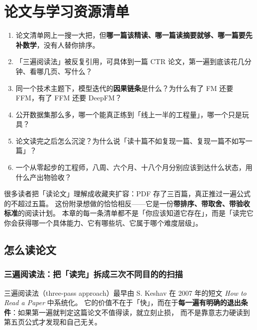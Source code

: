 \chapter{论文与学习资源清单}
\label{app:papers}

\begin{insight}[本附录要解决的问题]
\begin{enumerate}
  \item 论文清单网上一搜一大把，但\textbf{哪一篇该精读、哪一篇读摘要就够、哪一篇要先补数学}，没有人替你排序。
  \item 「三遍阅读法」被反复引用，可具体到一篇 CTR 论文，第一遍到底该花几分钟、看哪几页、写什么？
  \item 同一个技术主题下，模型迭代的\textbf{因果链条}是什么？为什么有了 FM 还要 FFM，有了 FFM 还要 DeepFM？
  \item 公开数据集那么多，哪一个能真正练到「线上一半的工程量」，哪一个只是玩具？
  \item 论文读完之后怎么沉淀？为什么说「读十篇不如复现一篇、复现一篇不如写一篇」？
  \item 一个从零起步的工程师，八周、六个月、十八个月分别应该到达什么状态，用什么产出物验收？
\end{enumerate}
\end{insight}

很多读者把「读论文」理解成收藏夹扩容：PDF 存了三百篇，真正推过一遍公式的不超过五篇。
这份附录想做的恰恰相反——它是一份\textbf{带排序、带取舍、带验收标准}的阅读计划。
本章的每一条清单都不是「你应该知道它存在」，而是「读完它你会获得哪一个具体能力、它有哪些坑、它属于哪个难度层级」。

\section{怎么读论文}

\subsection{三遍阅读法：把「读完」拆成三次不同目的的扫描}

三遍阅读法（three-pass approach）最早由 S. Keshav 在 2007 年的短文 \emph{How to Read a Paper} 中系统化。
它的价值不在于「快」，而在于\textbf{每一遍有明确的退出条件}：如果第一遍就判定这篇论文不值得读，就立刻止损，
而不是靠意志力硬读到第五页公式才发现和自己无关。

